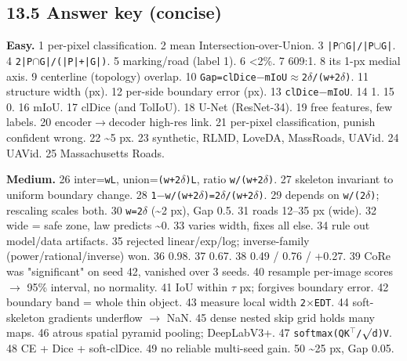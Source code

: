 \documentclass[11pt]{article}
\begin{document}
\subsection*{13.5 Answer key (concise)}

\textbf{Easy.} 1 per-pixel classification. 2 mean Intersection-over-Union. 3 \texttt{|P$\cap$G|/|P$\cup$G|}. 4 \texttt{2|P$\cap$G|/(|P|+|G|)}. 5 marking/road (label 1). 6 <2\%. 7 609:1. 8 its 1-px medial axis. 9 centerline (topology) overlap. 10 \texttt{Gap=clDice$-$mIoU$\approx$2$\delta$/(w+2$\delta$)}. 11 structure width (px). 12 per-side boundary error (px). 13 \texttt{clDice$-$mIoU}. 14 1. 15 0. 16 mIoU. 17 clDice (and TolIoU). 18 U-Net (ResNet-34). 19 free features, few labels. 20 encoder$\rightarrow$decoder high-res link. 21 per-pixel classification, punish confident wrong. 22 \textasciitilde{}5 px. 23 synthetic, RLMD, LoveDA, MassRoads, UAVid. 24 UAVid. 25 Massachusetts Roads.

\textbf{Medium.} 26 inter=\texttt{wL}, union=\texttt{(w+2$\delta$)L}, ratio \texttt{w/(w+2$\delta$)}. 27 skeleton invariant to uniform boundary change. 28 \texttt{1$-$w/(w+2$\delta$)=2$\delta$/(w+2$\delta$)}. 29 depends on \texttt{w/(2$\delta$)}; rescaling scales both. 30 \texttt{w=2$\delta$} (\textasciitilde{}2 px), Gap 0.5. 31 roads 12--35 px (wide). 32 wide = safe zone, law predicts \textasciitilde{}0. 33 varies width, fixes all else. 34 rule out model/data artifacts. 35 rejected linear/exp/log; inverse-family (power/rational/inverse) won. 36 0.98. 37 0.67. 38 0.49 / 0.76 / +0.27. 39 CoRe was "significant" on seed 42, vanished over 3 seeds. 40 resample per-image scores $\rightarrow$ 95\% interval, no normality. 41 IoU within \texttt{$\tau$} px; forgives boundary error. 42 boundary band = whole thin object. 43 measure local width \texttt{2$\times$EDT}. 44 soft-skeleton gradients underflow $\rightarrow$ NaN. 45 dense nested skip grid holds many maps. 46 atrous spatial pyramid pooling; DeepLabV3+. 47 \texttt{softmax(QK$^{\top}$/$\surd$d)V}. 48 CE + Dice + soft-clDice. 49 no reliable multi-seed gain. 50 \textasciitilde{}25 px, Gap 0.05.
\end{document}
